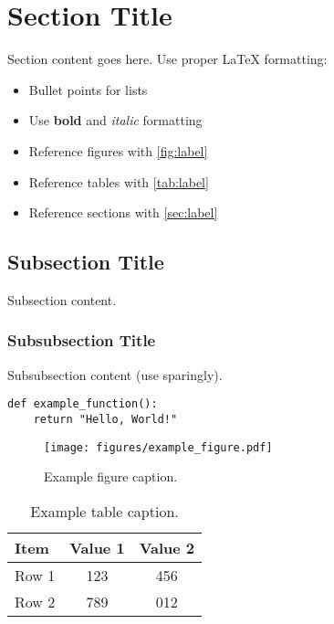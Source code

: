 
\section{Section Title}
\label{sec:section_label}

Section content goes here. Use proper LaTeX formatting:

\begin{itemize}
    \item Bullet points for lists
    \item Use \textbf{bold} and \textit{italic} formatting
    \item Reference figures with \autoref{fig:label}
    \item Reference tables with \autoref{tab:label}
    \item Reference sections with \autoref{sec:label}
\end{itemize}

\subsection{Subsection Title}
\label{subsec:subsection_label}

Subsection content.

\subsubsection{Subsubsection Title}

Subsubsection content (use sparingly).

\begin{lstlisting}[style=pythonstyle,caption={Python code example},label=lst:python_example]
def example_function():
    return "Hello, World!"
\end{lstlisting}

\begin{figure}[htbp]
    \centering
    \texttt{[image: figures/example\_figure.pdf]}
    \caption{Example figure caption.}
    \label{fig:example_figure}
\end{figure}

\begin{table}[htbp]
    \centering
    \caption{Example table caption.}
    \label{tab:example_table}
    \begin{tabular}{@{}lcc@{}}
        \toprule
        Item & Value 1 & Value 2 \\
        \midrule
        Row 1 & 123 & 456 \\
        Row 2 & 789 & 012 \\
        \bottomrule
    \end{tabular}
\end{table}

